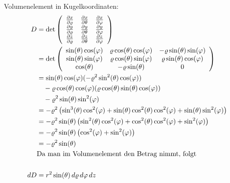 \documentclass[a4paper,10pt]{extarticle}
\begin{document}
  Volumenelement in Kugelkoordinaten:
  \begin{align*}
  D &= \det \left(\begin{array}{c c c}
    \pdv{x}{\varrho} & \pdv{x}{\theta} & \pdv{x}{\varphi} \\
    \pdv{y}{\varrho} & \pdv{y}{\theta} & \pdv{y}{\varphi} \\
    \pdv{z}{\varrho} & \pdv{z}{\theta} & \pdv{z}{\varphi} \\
  \end{array}\right) \\
  &= \det \left(\begin{array}{c c c}
    \sin(\theta)\cos(\varphi) & \varrho \cos(\theta) \cos(\varphi) & - \varrho \sin(\theta) \sin(\varphi) \\
    \sin(\theta) \sin(\varphi) & \varrho \cos(\theta) \sin(\varphi) & \varrho \sin(\theta) \cos(\varphi) \\
    \cos(\theta) & - \varrho \sin(\theta) & 0 \\
  \end{array}\right) \\
  &= \sin(\theta) \cos(\varphi) (- \varrho^2 \sin^2(\theta) \cos(\varphi)) \\
  & \quad - \varrho \cos(\theta) \cos(\varphi) (\varrho \cos(\theta) \sin(\theta) \cos(\varphi)) \\ 
  & \quad - \varrho^2 \sin(\theta) \sin^2(\varphi) \\
  &= - \varrho^2 \left(\sin^3(\theta) \cos^2(\varphi) + \sin(\theta) \cos^2(\theta) \cos^2(\varphi) + \sin(\theta) \sin^2(\varphi)\right) \\ 
  &= - \varrho^2 \sin(\theta) \left( \sin^2(\theta) \cos^2(\varphi) + \cos^2(\theta) \cos^2(\varphi) + \sin^2(\varphi) \right) \\
  &= - \varrho^2 \sin(\theta) \left( \cos^2(\varphi) + \sin^2(\varphi) \right) \\
  &= - \varrho^2 \sin(\theta) \\
  &\mbox{Da man im Volumenelement den Betrag nimmt, folgt} \\ \\
  dD &= r^2 \sin(\theta) \,d\varrho \, d\varphi \, dz
  \end{align*}
\end{document}
